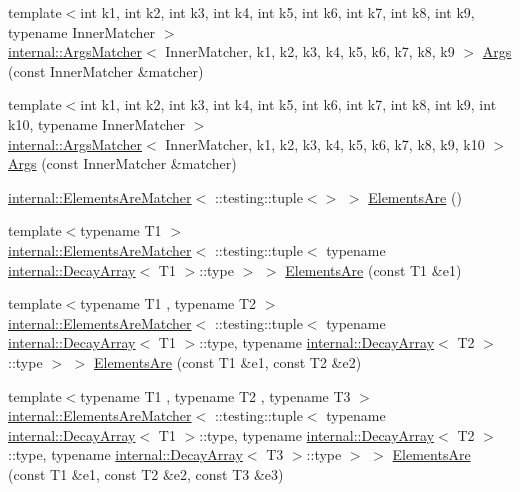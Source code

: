 \begin{DoxyCompactItemize}
\item 
{\footnotesize template$<$int k1, int k2, int k3, int k4, int k5, int k6, int k7, int k8, int k9, typename Inner\+Matcher $>$ }\\\hyperlink{classtesting_1_1internal_1_1_args_matcher}{internal\+::\+Args\+Matcher}$<$ Inner\+Matcher, k1, k2, k3, k4, k5, k6, k7, k8, k9 $>$ \hyperlink{namespacetesting_a62c877e01fb9098cd3c399f921bf4e3e}{Args} (const Inner\+Matcher \&matcher)
\item 
{\footnotesize template$<$int k1, int k2, int k3, int k4, int k5, int k6, int k7, int k8, int k9, int k10, typename Inner\+Matcher $>$ }\\\hyperlink{classtesting_1_1internal_1_1_args_matcher}{internal\+::\+Args\+Matcher}$<$ Inner\+Matcher, k1, k2, k3, k4, k5, k6, k7, k8, k9, k10 $>$ \hyperlink{namespacetesting_a09ac462e8d6ed468cbfaa9c767aee0aa}{Args} (const Inner\+Matcher \&matcher)
\item 
\hyperlink{classtesting_1_1internal_1_1_elements_are_matcher}{internal\+::\+Elements\+Are\+Matcher}$<$ \+::testing\+::tuple$<$$>$ $>$ \hyperlink{namespacetesting_a79cf4ae694bf8231dcf283b325405f27}{Elements\+Are} ()
\item 
{\footnotesize template$<$typename T1 $>$ }\\\hyperlink{classtesting_1_1internal_1_1_elements_are_matcher}{internal\+::\+Elements\+Are\+Matcher}$<$ \+::testing\+::tuple$<$ typename \hyperlink{structtesting_1_1internal_1_1_decay_array}{internal\+::\+Decay\+Array}$<$ T1 $>$\+::type $>$ $>$ \hyperlink{namespacetesting_aa35aa6c9638d989e9f4aaa6009f60589}{Elements\+Are} (const T1 \&e1)
\item 
{\footnotesize template$<$typename T1 , typename T2 $>$ }\\\hyperlink{classtesting_1_1internal_1_1_elements_are_matcher}{internal\+::\+Elements\+Are\+Matcher}$<$ \+::testing\+::tuple$<$ typename \hyperlink{structtesting_1_1internal_1_1_decay_array}{internal\+::\+Decay\+Array}$<$ T1 $>$\+::type, typename \hyperlink{structtesting_1_1internal_1_1_decay_array}{internal\+::\+Decay\+Array}$<$ T2 $>$\+::type $>$ $>$ \hyperlink{namespacetesting_a864f77fe7774308d4c54f1f52f9040cf}{Elements\+Are} (const T1 \&e1, const T2 \&e2)
\item 
{\footnotesize template$<$typename T1 , typename T2 , typename T3 $>$ }\\\hyperlink{classtesting_1_1internal_1_1_elements_are_matcher}{internal\+::\+Elements\+Are\+Matcher}$<$ \+::testing\+::tuple$<$ typename \hyperlink{structtesting_1_1internal_1_1_decay_array}{internal\+::\+Decay\+Array}$<$ T1 $>$\+::type, typename \hyperlink{structtesting_1_1internal_1_1_decay_array}{internal\+::\+Decay\+Array}$<$ T2 $>$\+::type, typename \hyperlink{structtesting_1_1internal_1_1_decay_array}{internal\+::\+Decay\+Array}$<$ T3 $>$\+::type $>$ $>$ \hyperlink{namespacetesting_a0be8a0ad5d7461fd1da13ecac4e21e2a}{Elements\+Are} (const T1 \&e1, const T2 \&e2, const T3 \&e3)
$$
\end{DoxyCompactItemize}
